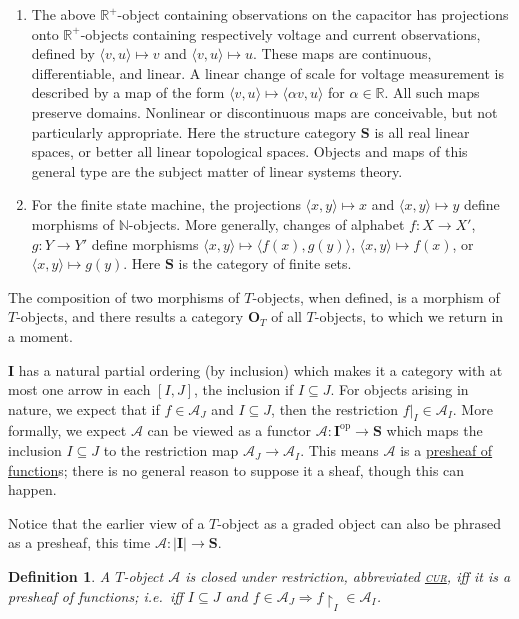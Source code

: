 \documentclass[10pt,a4paper,twocolumn]{article}
\newtheorem*{definition*}{Definition}
\newcommand{\A}{\mathcal{A}}          %
\newcommand{\CUR}{\underline{\textsc{cur}}\xspace}
\newcommand{\Ocat}{\mathbf{O}}          %
\newcommand{\Tcat}{\Ocat_{T}}      %
\newcommand{\Scat}{\mathbf{S}}          %
\newcommand{\Iset}{\mathbf{I}}          %
\newcommand{\R}{\mathbb{R}}
\newcommand{\Rpos}{\R^{+}}
\newcommand{\origpage}[1]{%
  \marginpar{\raggedright\footnotesize\itshape p.~#1}%
}
\begin{document}
\begin{enumerate}
	\item The above $\Rpos$-object containing observations on the capacitor has
	projections onto $\Rpos$-objects containing respectively voltage and
	current observations, defined by $\langle v,u\rangle\mapsto v$ and
	$\langle v,u\rangle\mapsto u$.
	These maps are continuous, differentiable, and linear.
	A linear change of scale for voltage measurement is described by a map of the form $\langle v,u\rangle\mapsto \langle\alpha v,u\rangle$ for $\alpha\in\R$.
  All such maps
	preserve domains.
	Nonlinear or discontinuous maps are conceivable, but not particularly appropriate.
	Here the structure category $\Scat$ is all real linear spaces, or better all linear topological spaces.
	Objects and maps of this general type are the subject matter of linear systems
	theory.

	\item For the finite state machine, the projections $\langle x,y\rangle \mapsto x$ and $\langle x,y\rangle\mapsto y$ define morphisms of $\mathbb{N}$-objects.
	More generally, changes of alphabet $f\colon X\to X'$, $g\colon Y\to Y'$ define morphisms $\langle x,y\rangle\mapsto \langle f(x),g(y)\rangle$, $\langle x,y\rangle\mapsto f(x)$, or $\langle x,y\rangle\mapsto g(y)$.
	Here $\Scat$ is the category of finite sets.
\end{enumerate}

The composition of two morphisms of $T$-objects, when defined, is a morphism of $T$-objects, and there results a category $\Tcat$ of all $T$-objects, to which we return in a moment.

$\Iset$ has a natural partial ordering (by inclusion) which makes it a category with at most one arrow in each $[I,J]$, the inclusion if $I\subseteq J$.
For objects arising in nature, we expect that if $f\in\A_{J}$ and $I\subseteq J$, then the restriction $f|_{I}\in\A_{I}$.
More formally, we expect $\A$ can be viewed as a functor $\A\colon \Iset^{\mathrm{op}}\to\Scat$ which maps the inclusion $I\subseteq J$ to the restriction map $\A_{J}\to\A_{I}$.
This means $\A$ is a \underline{presheaf of function}s; there is no general reason to suppose it a sheaf, though this can happen.

\origpage{124}%
Notice that the earlier view of a $T$-object as a graded object can also be
phrased as a presheaf, this time $\A\colon |\Iset|\to\Scat$.

\begin{definition*}
	A $T$-object $\A$ is \emph{closed under restriction}, abbreviated \CUR, iff it is a presheaf of functions; i.e.\ iff $I\subseteq J$ and $f\in\A_{J} \Rightarrow f\upharpoonright_{I}\in\A_{I}$.
\end{definition*}
\end{document}
